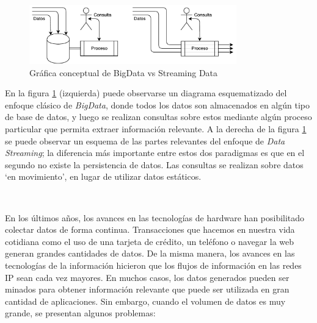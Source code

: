 \documentclass[a4paper,12pt, oneside]{article}
\begin{document}
\begin{figure}[htbp]
	\centering
	\includegraphics[width=0.8\textwidth]{./graph/bigdata_vs_streamingdata.pdf}
	\caption{Gráfica conceptual de BigData vs Streaming Data}
	\label{fig:bigdata_vs_streamingdata}
\end{figure}

En la figura \ref{fig:bigdata_vs_streamingdata} (izquierda) puede observarse un diagrama esquematizado del enfoque clásico de \textit{BigData}, donde todos los datos son almacenados en algún tipo de base de datos, y luego se realizan consultas sobre estos mediante algún proceso particular que permita extraer información relevante. A la derecha de la figura \ref{fig:bigdata_vs_streamingdata} se puede observar un esquema de las partes relevantes del enfoque de \textit{Data Streaming}; la diferencia más importante entre estos dos paradigmas es que en el segundo no existe la persistencia de datos. Las consultas se realizan sobre datos `en movimiento', en lugar de utilizar datos estáticos.

\

En los últimos años, los avances en las tecnologías de hardware han posibilitado colectar datos de forma continua. Transacciones que hacemos en nuestra vida cotidiana como el uso de una tarjeta de crédito, un teléfono o navegar la web generan grandes cantidades de datos. De la misma manera, los avances en las tecnologías de la información hicieron que los flujos de información en las redes IP sean cada vez mayores. En muchos casos, los datos generados pueden ser minados para obtener información relevante que puede ser utilizada en gran cantidad de aplicaciones. Sin embargo, cuando el volumen de datos es muy grande, se presentan algunos problemas:
\end{document}
